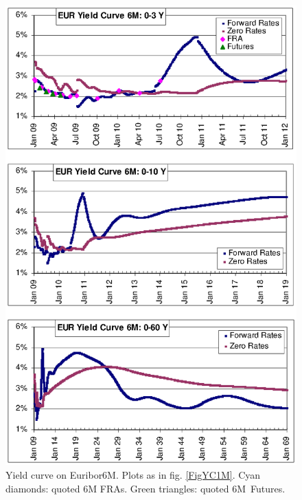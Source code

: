 \documentclass[11pt,reqno]{amsart}
\begin{document}
\begin{figure}[tbp]
\centering
\includegraphics[scale=0.9]{./FigYC6M}
\caption{Yield curve on Euribor6M. Plots as in fig. \protect\ref{FigYC1M}. Cyan diamonds: quoted 6M FRAs. Green triangles: quoted 6M\ Futures.}
\label{FigYC3M}
\end{figure}
\end{document}
